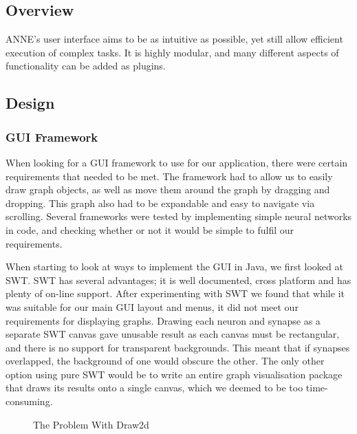 \documentclass{acm_proc_article-sp}
\begin{document}
\subsection{Overview}
{
ANNE's user interface aims to be as intuitive as possible, yet still allow efficient execution of complex tasks. It is highly modular, and many different aspects of functionality can be added as plugins.
}
\subsection{Design}
\subsubsection{GUI Framework}
{
When looking for a GUI framework to use for our application, there were certain requirements that needed to be met. The framework had to allow us to easily draw graph objects, as well as move them around the graph by dragging and dropping. This graph also had to be expandable and easy to navigate via scrolling. Several frameworks were tested by implementing simple neural networks in code, and checking whether or not it would be simple to fulfil our requirements.

When starting to look at ways to implement the GUI in Java, we first looked at SWT\cite{lib:swt}. SWT has several advantages; it is well documented, cross platform and has plenty of on-line support. After experimenting with SWT we found that while it was suitable for our main GUI layout and menus, it did not meet our requirements for displaying graphs. Drawing each neuron and synapse as a separate SWT canvas gave unusable result as each canvas must be rectangular, and there is no support for transparent backgrounds. This meant that if synapses overlapped, the background of one would obscure the other. The only other option using pure SWT would be to write an entire graph visualisation package that draws its results onto a single canvas, which we deemed to be too time-consuming.

\begin{figure}[t]
\centering
{}
\caption{The Problem With Draw2d}
\label{fig:ui:draw2d}
\end{figure}

}
\end{document}
